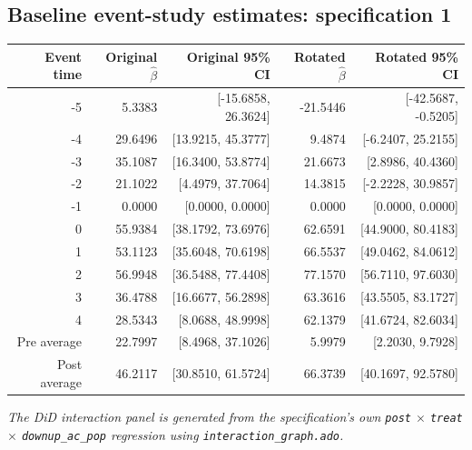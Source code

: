 \documentclass[10pt]{article}
\begin{document}
\subsection*{Baseline event-study estimates: specification 1}
\begin{center}
\scriptsize
\begin{tabular}{r rr rr}
\toprule
Event time & Original $\hat\beta$ & Original 95\% CI & Rotated $\hat\beta$ & Rotated 95\% CI \\
\midrule
-5 & 5.3383 & [-15.6858, 26.3624] & -21.5446 & [-42.5687, -0.5205] \\
-4 & 29.6496 & [13.9215, 45.3777] & 9.4874 & [-6.2407, 25.2155] \\
-3 & 35.1087 & [16.3400, 53.8774] & 21.6673 & [2.8986, 40.4360] \\
-2 & 21.1022 & [4.4979, 37.7064] & 14.3815 & [-2.2228, 30.9857] \\
-1 & 0.0000 & [0.0000, 0.0000] & 0.0000 & [0.0000, 0.0000] \\
0 & 55.9384 & [38.1792, 73.6976] & 62.6591 & [44.9000, 80.4183] \\
1 & 53.1123 & [35.6048, 70.6198] & 66.5537 & [49.0462, 84.0612] \\
2 & 56.9948 & [36.5488, 77.4408] & 77.1570 & [56.7110, 97.6030] \\
3 & 36.4788 & [16.6677, 56.2898] & 63.3616 & [43.5505, 83.1727] \\
4 & 28.5343 & [8.0688, 48.9998] & 62.1379 & [41.6724, 82.6034] \\
\midrule
Pre average & 22.7997 & [8.4968, 37.1026] & 5.9979 & [2.2030, 9.7928] \\
Post average & 46.2117 & [30.8510, 61.5724] & 66.3739 & [40.1697, 92.5780] \\
\bottomrule
\end{tabular}
\end{center}
\medskip
\textit{The DiD interaction panel is generated from the specification's own \texttt{post} $\times$ \texttt{treat} $\times$ \texttt{downup\_ac\_pop} regression using \texttt{interaction\_graph.ado}.}
\clearpage
\end{document}
